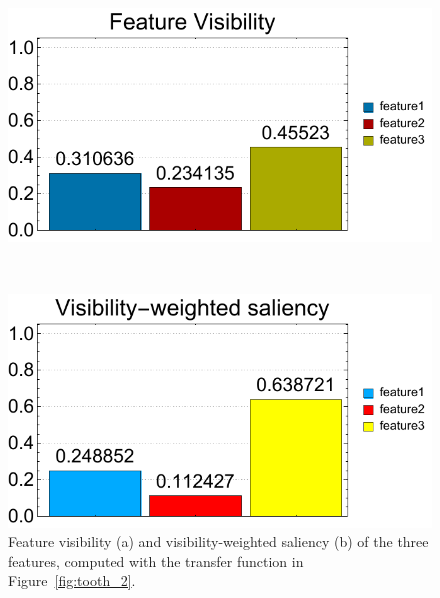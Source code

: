 \begin{figure}
	\centering
	\begin{minipage}{.45\textwidth}
		\includegraphics[width=1\linewidth]{figures/tooth_balance_visibility_chart}
		\subcaption{}
	\end{minipage}~
	\begin{minipage}{.45\textwidth}
		\includegraphics[width=1\linewidth]{figures/tooth_balance_visibility_saliency_weighted_chart}
		\subcaption{}
	\end{minipage}
	\caption[Feature visibility and visibility-weighted saliency of the three features]{Feature visibility (a) and visibility-weighted saliency (b) of the three features, computed with the transfer function in Figure~\ref{fig:tooth_2}.}
	\label{fig:tooth_saliency_chart_2}
\end{figure}

